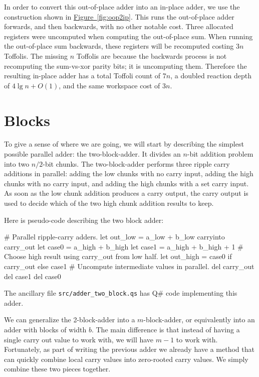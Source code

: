 \documentclass[onecolumn,unpublished]{quantumarticle}
\theoremstyle{definition}
\theoremstyle{definition}
\theoremstyle{definition}
\newcommand{\fig}[1]{\hyperref[fig:#1]{Figure~\ref*{fig:#1}}}
\begin{document}
In order to convert this out-of-place adder into an in-place adder, we use the construction shown in \fig{oop2ip}.
This runs the out-of-place adder forwards, and then backwards, with no other notable cost.
Three allocated registers were uncomputed when computing the out-of-place sum.
When running the out-of-place sum backwards, these registers will be recomputed costing $3n$ Toffolis.
The missing $n$ Toffolis are because the backwards process is not recomputing the sum-vs-xor parity bits; it is uncomputing them.
Therefore the resulting in-place adder has a total Toffoli count of $7n$, a doubled reaction depth of $4 \lg n + O(1)$, and the same workspace cost of $3n$.

\section{Blocks}

To give a sense of where we are going, we will start by describing the simplest possible parallel adder: the two-block-adder.
It divides an $n$-bit addition problem into two $n/2$-bit chunks.
The two-block-adder performs three ripple carry additions in parallel: adding the low chunks with no carry input, adding the high chunks with no carry input, and adding the high chunks with a set carry input.
As soon as the low chunk addition produces a carry output, the carry output is used to decide which of the two high chunk addition results to keep.

Here is pseudo-code describing the two block adder:

\begin{python}
    # Parallel ripple-carry adders.
    let out_low = a_low + b_low carryinto carry_out
    let case0 = a_high + b_high
    let case1 = a_high + b_high + 1
    # Choose high result using carry_out from low half.
    let out_high = case0 if carry_out else case1
    # Uncompute intermediate values in parallel.
    del carry_out
    del case1
    del case0
\end{python}

The ancillary file \texttt{src/adder\_two\_block.qs} has Q\# code implementing this adder.

We can generalize the 2-block-adder into a $m$-block-adder, or equivalently into an adder with blocks of width $b$.
The main difference is that instead of having a single carry out value to work with, we will have $m-1$ to work with.
Fortunately, as part of writing the previous adder we already have a method that can quickly combine local carry values into zero-rooted carry values.
We simply combine these two pieces together.
\end{document}
